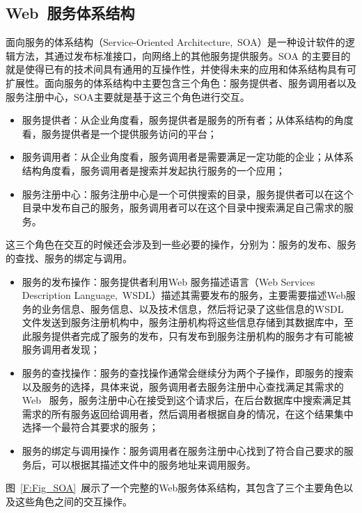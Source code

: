 \subsection{Web~服务体系结构}

面向服务的体系结构（Service-Oriented Architecture,~SOA）是一种设计软件的逻辑方法，其通过发布标准接口，向网络上的其他服务提供服务。SOA 的主要目的就是使得已有的技术间具有通用的互操作性，并使得未来的应用和体系结构具有可扩展性。面向服务的体系结构中主要包含三个角色：服务提供者、服务调用者以及服务注册中心，SOA主要就是基于这三个角色进行交互。

\begin{itemize}
  \item 服务提供者：从企业角度看，服务提供者是服务的所有者；从体系结构的角度看，服务提供者是一个提供服务访问的平台；
  \item 服务调用者：从企业角度看，服务调用者是需要满足一定功能的企业；从体系结构角度看，服务调用者是搜索并发起执行服务的一个应用；
  \item 服务注册中心：服务注册中心是一个可供搜索的目录，服务提供者可以在这个目录中发布自己的服务，服务调用者可以在这个目录中搜索满足自己需求的服务。
\end{itemize}

这三个角色在交互的时候还会涉及到一些必要的操作，分别为：服务的发布、服务的查找、服务的绑定与调用。

\begin{itemize}
  \item 服务的发布操作：服务提供者利用Web 服务描述语言（Web Services Description Language,~WSDL）描述其需要发布的服务，主要需要描述Web服务的业务信息、服务信息、以及技术信息，然后将记录了这些信息的WSDL 文件发送到服务注册机构中，服务注册机构将这些信息存储到其数据库中，至此服务提供者完成了服务的发布，只有发布到服务注册机构的服务才有可能被服务调用者发现；
  \item 服务的查找操作：服务的查找操作通常会继续分为两个子操作，即服务的搜索以及服务的选择，具体来说，服务调用者去服务注册中心查找满足其需求的Web~ 服务，服务注册中心在接受到这个请求后，在后台数据库中搜索满足其需求的所有服务返回给调用者，然后调用者根据自身的情况，在这个结果集中选择一个最符合其要求的服务；
  \item 服务的绑定与调用操作：服务调用者在服务注册中心找到了符合自己要求的服务后，可以根据其描述文件中的服务地址来调用服务。
\end{itemize}

图~\ref{F:Fig_SOA}~展示了一个完整的Web服务体系结构，其包含了三个主要角色以及这些角色之间的交互操作。

